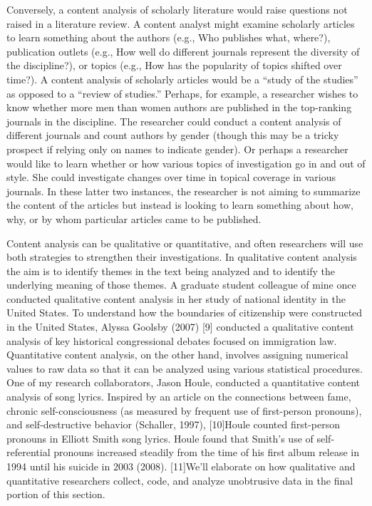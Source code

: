 Conversely, a content analysis of scholarly literature would raise questions not raised in a literature review. A content analyst might examine scholarly articles to learn something about the authors (e.g., Who publishes what, where?), publication outlets (e.g., How well do different journals represent the diversity of the discipline?), or topics (e.g., How has the popularity of topics shifted over time?). A content analysis of scholarly articles would be a “study of the studies” as opposed to a “review of studies.” Perhaps, for example, a researcher wishes to know whether more men than women authors are published in the top-ranking journals in the discipline. The researcher could conduct a content analysis of different journals and count authors by gender (though this may be a tricky prospect if relying only on names to indicate gender). Or perhaps a researcher would like to learn whether or how various topics of investigation go in and out of style. She could investigate changes over time in topical coverage in various journals. In these latter two instances, the researcher is not aiming to summarize the content of the articles but instead is looking to learn something about how, why, or by whom particular articles came to be published.

Content analysis can be qualitative or quantitative, and often researchers will use both strategies to strengthen their investigations. In qualitative content analysis the aim is to identify themes in the text being analyzed and to identify the underlying meaning of those themes. A graduate student colleague of mine once conducted qualitative content analysis in her study of national identity in the United States. To understand how the boundaries of citizenship were constructed in the United States, Alyssa Goolsby (2007) [9] conducted a qualitative content analysis of key historical congressional debates focused on immigration law. Quantitative content analysis, on the other hand, involves assigning numerical values to raw data so that it can be analyzed using various statistical procedures. One of my research collaborators, Jason Houle, conducted a quantitative content analysis of song lyrics. Inspired by an article on the connections between fame, chronic self-consciousness (as measured by frequent use of first-person pronouns), and self-destructive behavior (Schaller, 1997), [10]Houle counted first-person pronouns in Elliott Smith song lyrics. Houle found that Smith’s use of self-referential pronouns increased steadily from the time of his first album release in 1994 until his suicide in 2003 (2008). [11]We’ll elaborate on how qualitative and quantitative researchers collect, code, and analyze unobtrusive data in the final portion of this section.

